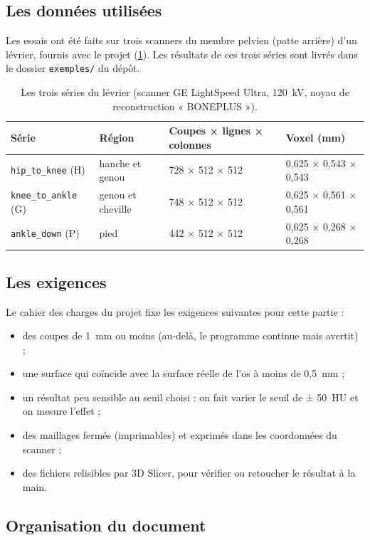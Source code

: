 \documentclass[11pt,a4paper]{article}
\newcommand{\fichier}[1]{\texttt{\small #1}}
\begin{document}
\subsection{Les données utilisées}

Les essais ont été faits sur trois scanners du membre pelvien (patte arrière) d'un lévrier, fournis avec le projet
(\cref{tab-donnees}). Les résultats de ces trois séries sont livrés dans le dossier \fichier{exemples/} du dépôt.

\begin{table}[h]
\centering\small
\caption{Les trois séries du lévrier (scanner GE LightSpeed Ultra, 120~kV, noyau de reconstruction « BONEPLUS »).}
\label{tab-donnees}
\begin{tabular}{llll}
\toprule
\textbf{Série} & \textbf{Région} & \textbf{Coupes × lignes × colonnes} & \textbf{Voxel (mm)} \\
\midrule
\fichier{hip\_to\_knee} (H) & hanche et genou & 728 × 512 × 512 & 0,625 × 0,543 × 0,543 \\
\fichier{knee\_to\_ankle} (G) & genou et cheville & 748 × 512 × 512 & 0,625 × 0,561 × 0,561 \\
\fichier{ankle\_down} (P) & pied & 442 × 512 × 512 & 0,625 × 0,268 × 0,268 \\
\bottomrule
\end{tabular}
\end{table}

\subsection{Les exigences}

Le cahier des charges du projet fixe les exigences suivantes pour cette partie :
\begin{itemize}
  \item des coupes de 1~mm ou moins (au-delà, le programme continue mais avertit) ;
  \item une surface qui coïncide avec la surface réelle de l'os à moins de 0,5~mm ;
  \item un résultat peu sensible au seuil choisi : on fait varier le seuil de ± 50~HU et on mesure l'effet ;
  \item des maillages fermés (imprimables) et exprimés dans les coordonnées du scanner ;
  \item des fichiers relisibles par 3D Slicer, pour vérifier ou retoucher le résultat à la main.
\end{itemize}

\subsection{Organisation du document}
\end{document}
